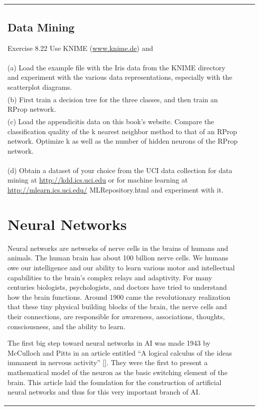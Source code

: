 \documentclass[10pt]{book}
\begin{document}
\begin{center}
\begin{tabular}{|l|l|l|}
\subsection{Data Mining}
Exercise 8.22 Use KNIME (\href{http://www.knime.de}{www.knime.de}) and\\
(a) Load the example file with the Iris data from the KNIME directory and experiment with the various data representations, especially with the scatterplot diagrams.\\
(b) First train a decision tree for the three classes, and then train an RProp network.\\
(c) Load the appendicitis data on this book's website. Compare the classification quality of the k nearest neighbor method to that of an RProp network. Optimize k as well as the number of hidden neurons of the RProp network.\\
(d) Obtain a dataset of your choice from the UCI data collection for data mining at \href{http://kdd.ics.uci.edu}{http://kdd.ics.uci.edu} or for machine learning at \href{http://mlearn.ics.uci.edu/}{http://mlearn.ics.uci.edu/} MLRepository.html and experiment with it.
\section{Neural Networks}
Neural networks are networks of nerve cells in the brains of humans and animals. The human brain has about 100 billion nerve cells. We humans owe our intelligence and our ability to learn various motor and intellectual capabilities to the brain's complex relays and adaptivity. For many centuries biologists, psychologists, and doctors have tried to understand how the brain functions. Around 1900 came the revolutionary realization that these tiny physical building blocks of the brain, the nerve cells and their connections, are responsible for awareness, associations, thoughts, consciousness, and the ability to learn.

The first big step toward neural networks in AI was made 1943 by McCulloch and Pitts in an article entitled ``A logical calculus of the ideas immanent in nervous activity'' [\cite{ar88}]. They were the first to present a mathematical model of the neuron as the basic switching element of the brain. This article laid the foundation for the construction of artificial neural networks and thus for this very important branch of AI.


\end{tabular}
\end{center}
\end{document}
